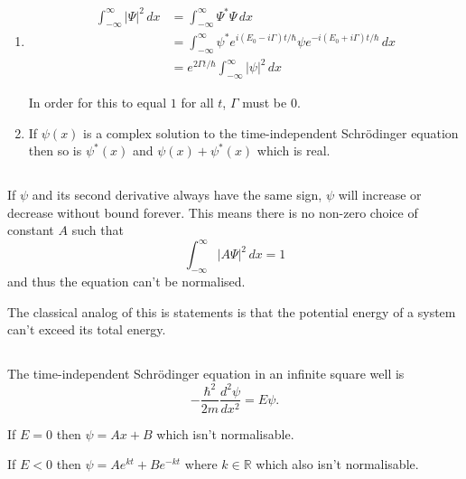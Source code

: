 \documentclass{article}
\begin{document}
\begin{enumerate}
  \item

        \begin{align*}
          \int_{-\infty}^\infty |\Psi|^2 \,d x & = \int_{-\infty}^\infty \Psi^* \Psi \,d x                                                                    \\
                                               & = \int_{-\infty}^\infty \psi^* e^{i (E_0 - i \Gamma) t / \hbar} \psi e^{-i (E_0 + i \Gamma) t / \hbar} \,d x \\
                                               & = e^{2 \Gamma t / \hbar} \int_{-\infty}^\infty |\psi|^2 \,d x
        \end{align*}

        In order for this to equal $1$ for all $t$, $\Gamma$ must be $0$.

  \item If $\psi(x)$ is a complex solution to the time-independent Schrödinger equation then so is $\psi^*(x)$ and $\psi(x) + \psi^*(x)$ which is real.
\end{enumerate}

\subsection{}

If $\psi$ and its second derivative always have the same sign, $\psi$ will increase or decrease without bound forever. This means there is no non-zero choice of constant $A$ such that \[\int_{-\infty}^\infty |A \Psi|^2 \,d x = 1\] and thus the equation can't be normalised.

The classical analog of this is statements is that the potential energy of a system can't exceed its total energy.

\subsection{}

The time-independent Schrödinger equation in an infinite square well is \[-\frac{\hbar^2}{2 m} \frac{d^2 \psi}{d x^2} = E \psi.\]

If $E = 0$ then $\psi = A x + B$ which isn't normalisable.

If $E < 0$ then $\psi = A e^{k t} + B e^{-k t}$ where $k \in \mathbb{R}$ which also isn't normalisable.

\subsection{}
\end{document}

